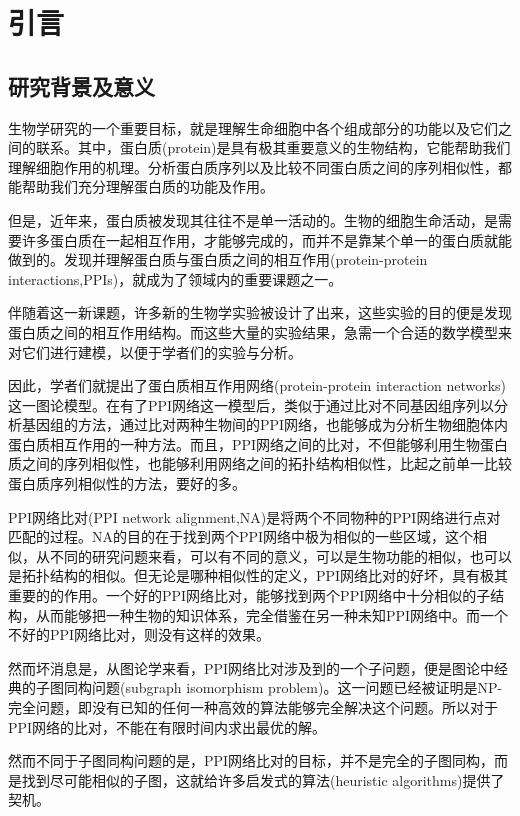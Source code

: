 \chapter{引言}
\section{研究背景及意义}
生物学研究的一个重要目标，就是理解生命细胞中各个组成部分的功能以及它们之间的联系。其中，蛋白质(protein)是具有极其重要意义的生物结构，它能帮助我们理解细胞作用的机理。分析蛋白质序列以及比较不同蛋白质之间的序列相似性，都能帮助我们充分理解蛋白质的功能及作用。

但是，近年来，蛋白质被发现其往往不是单一活动的。生物的细胞生命活动，是需要许多蛋白质在一起相互作用，才能够完成的，而并不是靠某个单一的蛋白质就能做到的。发现并理解蛋白质与蛋白质之间的相互作用(protein-protein interactions,PPIs)，就成为了领域内的重要课题之一。

伴随着这一新课题，许多新的生物学实验\cite{uetz2000comprehensive,ito2001comprehensive,krogan2006global,han2004evidence,nabieva2005whole,yook2004functional}被设计了出来，这些实验的目的便是发现蛋白质之间的相互作用结构。而这些大量的实验结果，急需一个合适的数学模型来对它们进行建模，以便于学者们的实验与分析。

因此，学者们就提出了蛋白质相互作用网络(protein-protein interaction networks)这一图论模型。在有了PPI网络这一模型后，类似于通过比对不同基因组序列以分析基因组的方法，通过比对两种生物间的PPI网络，也能够成为分析生物细胞体内蛋白质相互作用的一种方法。而且，PPI网络之间的比对，不但能够利用生物蛋白质之间的序列相似性，也能够利用网络之间的拓扑结构相似性，比起之前单一比较蛋白质序列相似性的方法，要好的多。

PPI网络比对(PPI network alignment,NA)是将两个不同物种的PPI网络进行点对匹配的过程。NA的目的在于找到两个PPI网络中极为相似的一些区域，这个相似，从不同的研究问题来看，可以有不同的意义，可以是生物功能的相似，也可以是拓扑结构的相似。但无论是哪种相似性的定义，PPI网络比对的好坏，具有极其重要的的作用。一个好的PPI网络比对，能够找到两个PPI网络中十分相似的子结构，从而能够把一种生物的知识体系，完全借鉴在另一种未知PPI网络中。而一个不好的PPI网络比对，则没有这样的效果。

然而坏消息是，从图论学来看，PPI网络比对涉及到的一个子问题，便是图论中经典的子图同构问题(subgraph isomorphism problem)。这一问题已经被证明是NP-完全问题，即没有已知的任何一种高效的算法能够完全解决这个问题。所以对于PPI网络的比对，不能在有限时间内求出最优的解。

然而不同于子图同构问题的是，PPI网络比对的目标，并不是完全的子图同构，而是找到尽可能相似的子图，这就给许多启发式的算法(heuristic algorithms)提供了契机。

